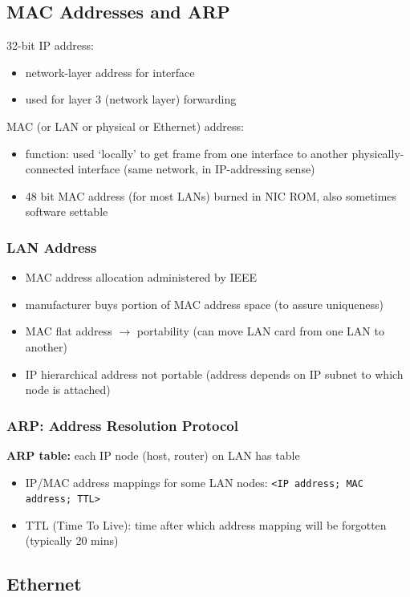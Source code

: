 \subsection{MAC Addresses and ARP}
32-bit IP address:
\begin{itemize}
	\item network-layer address for interface
	\item used for layer 3 (network layer) forwarding
\end{itemize}
MAC (or LAN or physical or Ethernet) address:
\begin{itemize}
	\item function: used `locally' to get frame from one interface to another physically-connected interface (same network, in IP-addressing sense)
	\item 48 bit MAC address (for most LANs) burned in NIC ROM, also sometimes software settable
\end{itemize}
\subsubsection{LAN Address}
\begin{itemize}
	\item MAC address allocation administered by IEEE
	\item manufacturer buys portion of MAC address space (to assure uniqueness)
	\item MAC flat address $\rightarrow$ portability (can move LAN card from one LAN to another)
	\item IP hierarchical address not portable (address depends on IP subnet to which node is attached)
\end{itemize}
\subsubsection{ARP: Address Resolution Protocol}
\textbf{ARP table:} each IP node (host, router) on LAN has table
\begin{itemize}
	\item IP/MAC address mappings for some LAN nodes: \texttt{<IP address; MAC address; TTL>}
	\item TTL (Time To Live): time after which address mapping will be forgotten (typically 20 mins)
\end{itemize}

\subsection{Ethernet}
